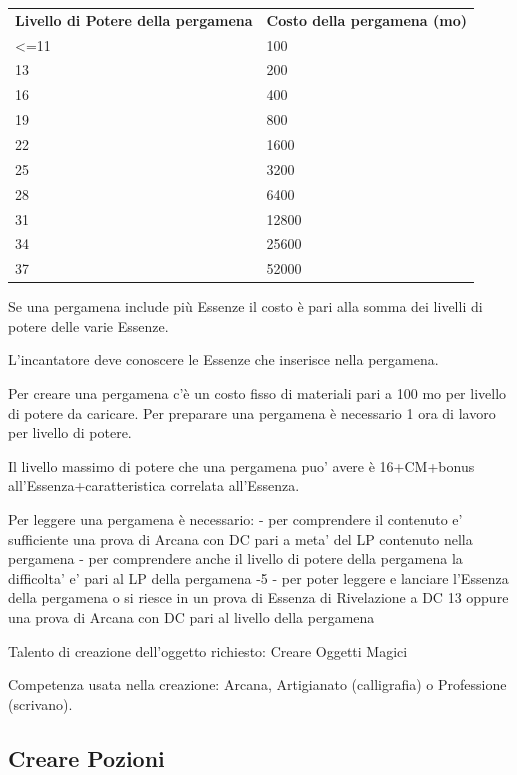 \documentclass[a4paper,11pt,twoside,openany]{book}
\begin{document}
\begin{tabular}{ll}
	\toprule
	\textbf{Livello di Potere della pergamena} & \textbf{Costo della pergamena (mo)}\\
	\textless=11               & 100\\
	13         & 200\\
	16         & 400\\
	19         & 800\\
	22         & 1600\\
	25         & 3200\\
	28         & 6400\\
	31         & 12800\\
	34         & 25600\\
	37         & 52000\\
\end{tabular}

\bigskip

Se una pergamena include più Essenze il costo è pari alla somma dei livelli di potere delle varie Essenze.

L'incantatore deve conoscere le Essenze che inserisce nella pergamena.

Per creare una pergamena c'è un costo fisso di materiali pari a 100 mo per livello di potere da caricare. Per preparare una pergamena è necessario 1 ora di lavoro per livello di potere.

Il livello massimo di potere che una pergamena puo' avere è 16+CM+bonus all'Essenza+caratteristica correlata all'Essenza.

Per leggere una pergamena è necessario:
- per comprendere il contenuto e' sufficiente una prova di Arcana con DC pari a meta' del LP contenuto nella pergamena
- per comprendere anche il livello di potere della pergamena la difficolta' e' pari al LP della pergamena -5
- per poter leggere e lanciare l'Essenza della pergamena o si riesce in un prova di Essenza di Rivelazione a DC 13 oppure una prova di Arcana con DC pari al livello della pergamena

Talento di creazione dell'oggetto richiesto: Creare Oggetti Magici

Competenza usata nella creazione: Arcana, Artigianato (calligrafia) o Professione (scrivano).

\subsection{Creare Pozioni}
\end{document}
